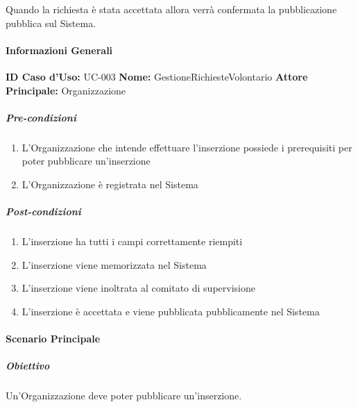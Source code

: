 Quando la richiesta è stata accettata allora verrà confermata la pubblicazione pubblica sul Sistema.

\paragraph{Informazioni Generali}

\textbf{ID Caso d'Uso:} UC-003
\textbf{Nome:} GestioneRichiesteVolontario
\textbf{Attore Principale:} Organizzazione

\subparagraph{Pre-condizioni}
\begin{enumerate}
    \item L'Organizzazione che intende effettuare l'inserzione possiede i prerequisiti per poter pubblicare un'inserzione
    \item L'Organizzazione è registrata nel Sistema
\end{enumerate}

\subparagraph{Post-condizioni}
\begin{enumerate}
    \item L'inserzione ha tutti i campi correttamente riempiti
    \item L'inserzione viene memorizzata nel Sistema
    \item L'inserzione viene inoltrata al comitato di supervisione
    \item L'inserzione è accettata e viene pubblicata pubblicamente nel Sistema
\end{enumerate}

\paragraph{Scenario Principale}

\subparagraph{Obiettivo}
Un'Organizzazione deve poter pubblicare un'inserzione.

